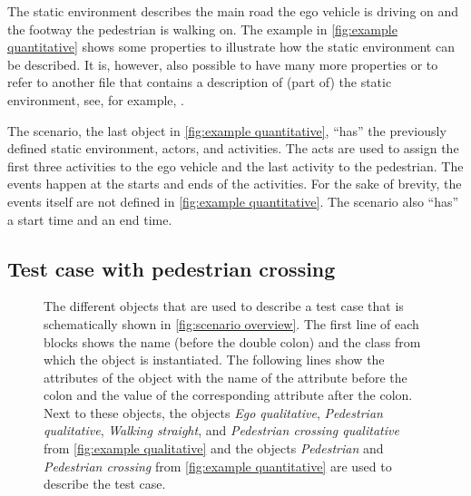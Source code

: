 The static environment describes the main road the ego vehicle is driving on and the footway the pedestrian is walking on. The example in \cref{fig:example quantitative} shows some properties to illustrate how the static environment can be described. It is, however, also possible to have many more properties or to refer to another file that contains a description of (part of) the static environment, see, for example, \cite{dupuis2010opendrive}. 

The scenario, the last object in \cref{fig:example quantitative}, ``has'' the previously defined static environment, actors, and activities. The acts are used to assign the first three activities to the ego vehicle and the last activity to the pedestrian. The events happen at the starts and ends of the activities. For the sake of brevity, the events itself are not defined in \cref{fig:example quantitative}. The scenario also ``has'' a start time and an end time.

\subsection{Test case with pedestrian crossing}
\label{sec:example test case}

\cbend
\begin{figure}
	\centering
	
	\caption{\cbstart The different objects that are used to describe a test case that is schematically shown in \cref{fig:scenario overview}. The first line of each blocks shows the name (before the double colon) and the class from which the object is instantiated. The following lines show the attributes of the object with the name of the attribute before the colon and the value of the corresponding attribute after the colon. Next to these objects, the objects \emph{Ego qualitative}, \emph{Pedestrian qualitative}, \emph{Walking straight}, and \emph{Pedestrian crossing qualitative} from \cref{fig:example qualitative} and the objects \emph{Pedestrian} and \emph{Pedestrian crossing} from \cref{fig:example quantitative} are used to describe the test case.\cbend}
	\label{fig:example test case}
\end{figure}
\cbstart

